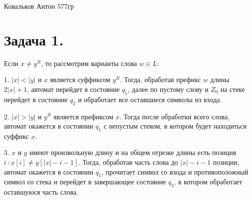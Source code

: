 \documentclass[12pt]{article}
\theoremstyle{definition}
\theoremstyle{definition}
\let\epsilon\varepsilon
\let\eps\varepsilon
\begin{document}
\begin{center} {\LARGE Ковальков Антон 577гр} \end{center}
\section*{Задача 1.} 


	Если $x \neq y^R$, то рассмотрим варианты слова $w\in L$:
	
	1. $|x|<|y|$ и $x$ является суффиксом $y^R$. Тогда, обработав префикс $w$ длины $2|x|+1$, автомат перейдет в состояние $q_1$, далее по пустому слову и $Z_0$ на стеке перейдет в состояние $q_2$ и обработает все оставшиеся символы из входа.
	
	2. $|x|>|y|$ и $y^R$ является префиксом $x$. Тогда после обработки всего слова, автомат окажется в состоянии $q_1$ с непустым стеком, в котором будет находиться суффикс $x$.
	
	3. $x$ и $y$  имеют произвольную длину и на общем отрезке длины есть позиция $i\ : x[i] \neq y [ |x| - i - 1 ] $. Тогда, обработав часть слова до $|x| - i - 1$  позиции, автомат окажется в состоянии $q_1$, прочитает символ со входа и противоположный символ со стека и перейдет в завершающее состояние $q_3$, в котором обработает оставшуюся часть слова.
\end{document}
